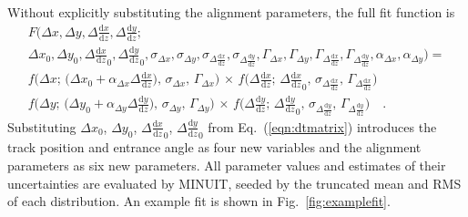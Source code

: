 Without explicitly substituting the alignment parameters, the full fit
function is
\begin{multline}
F\bigg(\Delta x, \Delta y, \Delta \tfrac{\textrm{d}x}{\textrm{d}z}, \Delta \tfrac{\textrm{d}y}{\textrm{d}z}; \\
{\Delta x}_0, {\Delta y}_0, {\Delta \frac{\textrm{d}x}{\textrm{d}z}}_0, {\Delta \frac{\textrm{d}y}{\textrm{d}z}}_0,
\sigma_{\Delta x}, \sigma_{\Delta y}, \sigma_{\Delta \tfrac{\textrm{d}x}{\textrm{d}z}}, \sigma_{\Delta \tfrac{\textrm{d}y}{\textrm{d}z}},
\Gamma_{\Delta x}, \Gamma_{\Delta y}, \Gamma_{\Delta \tfrac{\textrm{d}x}{\textrm{d}z}}, \Gamma_{\Delta \tfrac{\textrm{d}y}{\textrm{d}z}},
\alpha_{\Delta x}, \alpha_{\Delta y}) = \\
f\bigg(\Delta x; \, \big({\Delta x}_0 + \alpha_{\Delta x} \Delta \tfrac{\textrm{d}x}{\textrm{d}z}\big), \, \sigma_{\Delta x}, \, \Gamma_{\Delta x}\bigg) \, \times \,
f\bigg(\Delta \tfrac{\textrm{d}x}{\textrm{d}z}; \, {\Delta \tfrac{\textrm{d}x}{\textrm{d}z}}_0, \, \sigma_{\Delta \tfrac{\textrm{d}x}{\textrm{d}z}}, \, \Gamma_{\Delta \tfrac{\textrm{d}x}{\textrm{d}z}}\bigg) \\
f\bigg(\Delta y; \, \big({\Delta y}_0 + \alpha_{\Delta y} \Delta \tfrac{\textrm{d}y}{\textrm{d}z}\big), \, \sigma_{\Delta y}, \, \Gamma_{\Delta y}\bigg) \, \times \,
f\bigg(\Delta \tfrac{\textrm{d}y}{\textrm{d}z}; \, {\Delta \tfrac{\textrm{d}y}{\textrm{d}z}}_0, \, \sigma_{\Delta \tfrac{\textrm{d}y}{\textrm{d}z}}, \, \Gamma_{\Delta \tfrac{\textrm{d}y}{\textrm{d}z}}\bigg)\quad\mbox{.}
\label{eqn:fitfunc}
\end{multline}
Substituting $\Delta x_0$, $\Delta y_0$, $\Delta {\frac{\textrm{d}x}{\textrm{d}z}}_0$, $\Delta {\frac{\textrm{d}y}{\textrm{d}z}}_0$
from Eq.~(\ref{eqn:dtmatrix}) introduces the track position and
entrance angle as four new variables and the alignment parameters as
six new parameters.  All parameter values and estimates of their
uncertainties are evaluated by MINUIT, seeded by the truncated mean
and RMS of each distribution.  An example fit is shown in Fig.~\ref{fig:examplefit}.

